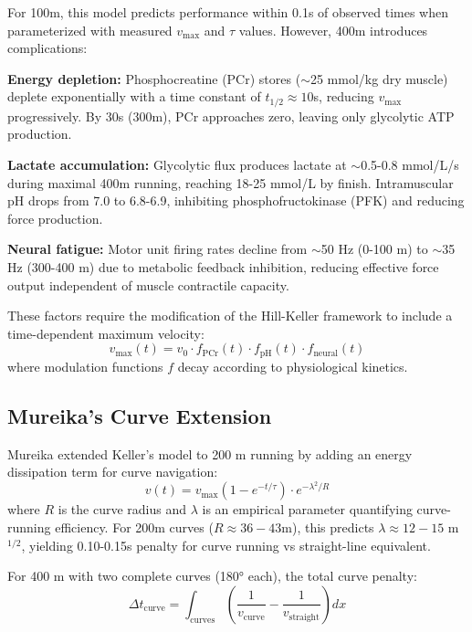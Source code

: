 \documentclass[12pt,a4paper]{article}
\begin{document}
For 100m, this model predicts performance within 0.1s of observed times when parameterized with measured $v_{\max}$ and $\tau$ values. However, 400m introduces complications:

\textbf{Energy depletion:} Phosphocreatine (PCr) stores ($\sim$25 mmol/kg dry muscle) deplete exponentially with a time constant of $t_{1/2} \approx 10$s, reducing $v_{\max}$ progressively. By 30s (300m), PCr approaches zero, leaving only glycolytic ATP production.

\textbf{Lactate accumulation:} Glycolytic flux produces lactate at $\sim$0.5-0.8 mmol/L/s during maximal 400m running, reaching 18-25 mmol/L by finish. Intramuscular pH drops from 7.0 to 6.8-6.9, inhibiting phosphofructokinase (PFK) and reducing force production.

\textbf{Neural fatigue:} Motor unit firing rates decline from $\sim$50 Hz (0-100 m) to $\sim$35 Hz (300-400 m) due to metabolic feedback inhibition, reducing effective force output independent of muscle contractile capacity.

These factors require the modification of the Hill-Keller framework to include a time-dependent maximum velocity:
\begin{equation}
v_{\max}(t) = v_0 \cdot f_{\text{PCr}}(t) \cdot f_{\text{pH}}(t) \cdot f_{\text{neural}}(t)
\end{equation}
where modulation functions $f$ decay according to physiological kinetics.

\subsection{Mureika's Curve Extension}

Mureika \citep{Mureika1997} extended Keller's model to 200 m running by adding an energy dissipation term for curve navigation:
\begin{equation}
v(t) = v_{\max} (1 - e^{-t/\tau}) \cdot e^{-\lambda^2 / R}
\end{equation}
where $R$ is the curve radius and $\lambda$ is an empirical parameter quantifying curve-running efficiency. For 200m curves ($R \approx 36-43$m), this predicts $\lambda \approx 12-15$ m$^{1/2}$, yielding 0.10-0.15s penalty for curve running vs straight-line equivalent.

For 400 m with two complete curves (180° each), the total curve penalty:
\begin{equation}
\Delta t_{\text{curve}} = \int_{\text{curves}} \left( \frac{1}{v_{\text{curve}}} - \frac{1}{v_{\text{straight}}} \right) dx
\end{equation}
\end{document}
